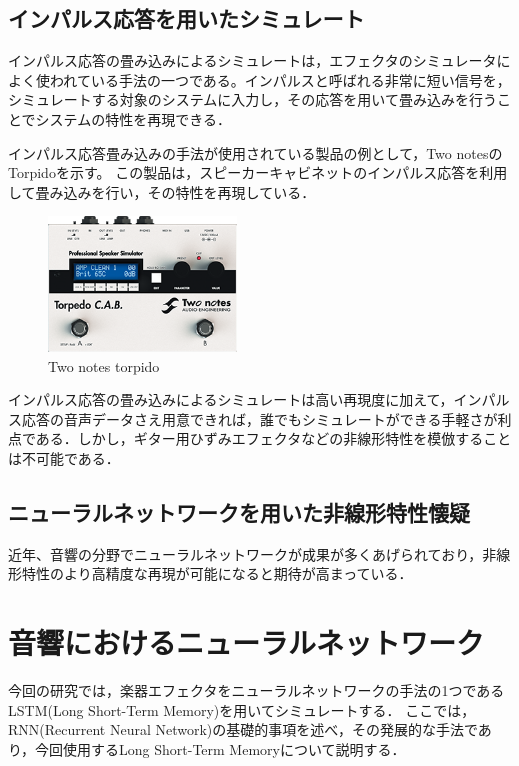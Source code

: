\documentclass{jreport}		%
\begin{document}
\section{インパルス応答を用いたシミュレート}
インパルス応答の畳み込みによるシミュレートは，エフェクタのシミュレータによく使われている手法の一つである。インパルスと呼ばれる非常に短い信号を，シミュレートする対象のシステムに入力し，その応答を用いて畳み込みを行うことでシステムの特性を再現できる．

インパルス応答畳み込みの手法が使用されている製品の例として，Two notesのTorpidoを示す。\cite{torpido}
この製品は，スピーカーキャビネットのインパルス応答を利用して畳み込みを行い，その特性を再現している．

\begin{figure}[htbp]
 \begin{center}
  \includegraphics[width=50mm]{torpido.png}
 \end{center}
 \caption{Two notes torpido}
 \label{fig:one}
\end{figure}

インパルス応答の畳み込みによるシミュレートは高い再現度に加えて，インパルス応答の音声データさえ用意できれば，誰でもシミュレートができる手軽さが利点である．しかし，ギター用ひずみエフェクタなどの非線形特性を模倣することは不可能である．

\section{ニューラルネットワークを用いた非線形特性懐疑}
近年、音響の分野でニューラルネットワークが成果が多くあげられており，非線形特性のより高精度な再現が可能になると期待が高まっている．

\chapter{音響におけるニューラルネットワーク}
今回の研究では，楽器エフェクタをニューラルネットワークの手法の1つであるLSTM(Long Short-Term Memory)を用いてシミュレートする．
ここでは，RNN(Recurrent Neural Network)の基礎的事項を述べ，その発展的な手法であり，今回使用するLong Short-Term Memoryについて説明する．
\end{document}
